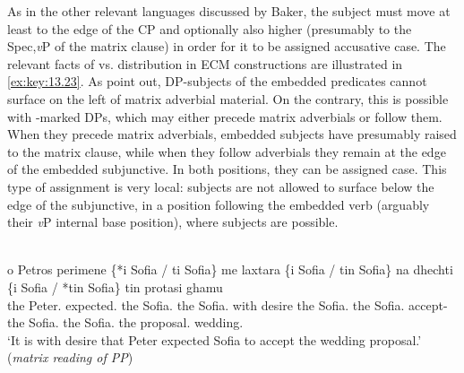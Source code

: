 \documentclass[output=paper]{langsci/langscibook}
\begin{document}
\ea%
    \label{ex:key:13.22}
    \z
\z

As in the other relevant languages discussed by Baker, the subject must move at
least to the edge of the CP and optionally also higher (presumably to the
Spec,\emph{v}P of the matrix clause) in order for it to be assigned accusative
case.  The relevant facts of \Acc{} vs. \Nom{} distribution in  ECM
constructions are illustrated in \eqref{ex:key:13.23}. As \citet{KotzPapa2007} point
out, \Nom{} DP-subjects of the embedded predicates cannot surface on the left of
matrix adverbial material. On the contrary, this is possible with \Acc{}-marked
DPs, which may either precede matrix adverbials or follow them. When they
precede matrix adverbials, embedded \Acc{} subjects have presumably raised to the
matrix clause, while when they follow adverbials they remain at the edge of the
embedded subjunctive. In both positions, they can be assigned \Acc{} case. This
type of \Acc{} assignment is very local: \Acc{} subjects are not allowed to
surface below the edge of the subjunctive, in a position following the embedded
verb (arguably their \emph{v}P internal base position), where \Nom{} subjects are
possible.

\ea%
\label{ex:key:13.23}\\
    \gll o Petros perimene \{*i Sofia / ti Sofia\} me laxtara \{i Sofia / tin Sofia\} na dhechti \{i Sofia / *tin Sofia\} tin protasi ghamu \\
    the Peter.\Nom{} expected.\Tsg{} \hphantom{\{*}the Sofia.\textbf{\Nom{}} {}
        the Sofia.\textbf{\Acc{}} with desire \hphantom{\{}the
            Sofia.\textbf{\Nom} {} the Sofia.\textbf{\Acc} \Sbjv{} accept-\Tsg{}
            \hphantom{\{}the Sofia.\textbf{\Nom} {} \hphantom{*}the
                Sofia.\textbf{\Acc} the proposal.\Acc{} wedding.\Gen{}\\
    \glt    \enquote*{It is with desire that Peter expected Sofia to accept the wedding proposal.} (\emph{matrix reading of PP})
\z
\end{document}

